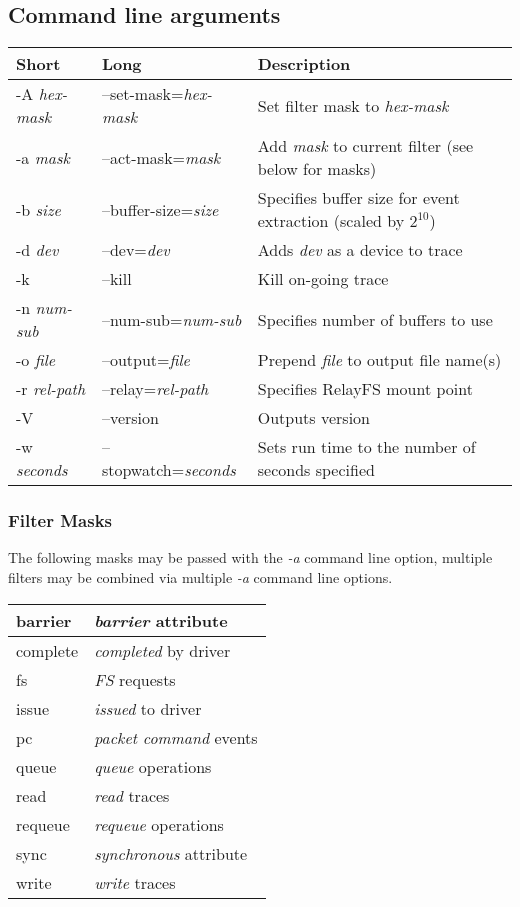\documentclass{article}
\begin{document}
\subsection{\label{sec:blktrace-args}Command line arguments}
\begin{tabular}{|l|l|l|}\hline
Short              & Long                       & Description \\ \hline\hline
-A \emph{hex-mask} & --set-mask=\emph{hex-mask} & Set filter mask to \emph{hex-mask} \\ \hline
-a \emph{mask}     & --act-mask=\emph{mask}     & Add \emph{mask} to current filter (see below for masks) \\ \hline
-b \emph{size}     & --buffer-size=\emph{size}  & Specifies buffer size for event extraction (scaled by $2^{10}$) \\ \hline
-d \emph{dev}      & --dev=\emph{dev}           & Adds \emph{dev} as a device to trace \\ \hline
-k                 & --kill                     & Kill on-going trace \\ \hline
-n \emph{num-sub}  & --num-sub=\emph{num-sub}   & Specifies number of buffers to use \\ \hline
-o \emph{file}     & --output=\emph{file}       & Prepend \emph{file} to output file name(s) \\ \hline
-r \emph{rel-path} & --relay=\emph{rel-path}    & Specifies RelayFS mount point \\ \hline
-V                 & --version                  & Outputs version \\ \hline
-w \emph{seconds}  & --stopwatch=\emph{seconds} & Sets run time to the number of seconds specified \\ \hline
\end{tabular}

\subsubsection{\label{sec:filter-mask}Filter Masks}
The following masks may be passed with the \emph{-a} command line
option, multiple filters may be combined via multiple \emph{-a} command
line options.\smallskip

\begin{tabular}{|l|l|}\hline
barrier & \emph{barrier} attribute \\ \hline
complete & \emph{completed} by driver \\ \hline
fs & \emph{FS} requests \\ \hline
issue & \emph{issued} to driver \\ \hline
pc & \emph{packet command} events \\ \hline
queue & \emph{queue} operations \\ \hline
read & \emph{read} traces \\ \hline
requeue & \emph{requeue} operations \\ \hline
sync & \emph{synchronous} attribute \\ \hline
write & \emph{write} traces \\ \hline
\end{tabular}
\end{document}
